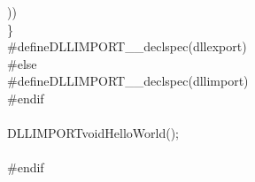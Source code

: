 \documentclass[a4paper, 10pt]{article}
\newcommand\SPC{\hspace*{0.6em}}
\newcommand\TAB{\hspace*{1.2em}}
\newcommand{\CppAIdentifier}[1]{#1}
\newcommand{\CppAPreprocessor}[1]{\textcolor[rgb]{0,0,1}{#1}}
\newcommand{\CppAReservedWord}[1]{\textcolor[rgb]{0,0,1}{#1}}
\newcommand{\CppASpace}[1]{\colorbox[rgb]{1,1,1}{#1}}
\newcommand{\CppASymbol}[1]{#1}
\begin{document}
\begin{ttfamily}
\CppASpace{\TAB \TAB \TAB \TAB }\CppASymbol{)}\CppASymbol{)}\\
\CppASpace{\SPC \SPC \SPC \SPC \SPC \SPC \SPC \SPC }\CppASymbol{\}}\CppASpace{\SPC }\\
\CppAPreprocessor{\#define\SPC DLLIMPORT\SPC \_\_declspec(dllexport)}\\
\CppAPreprocessor{\#else}\\
\CppAPreprocessor{\#define\SPC DLLIMPORT\SPC \_\_declspec(dllimport)}\\
\CppAPreprocessor{\#endif}\\
\\
\CppAIdentifier{DLLIMPORT}\CppASpace{\SPC }\CppAReservedWord{void}\CppASpace{\SPC }\CppAIdentifier{HelloWorld}\CppASymbol{(}\CppASymbol{)}\CppASymbol{;}\\
\\
\CppAPreprocessor{\#endif}\\

\end{ttfamily}
\end{document}
